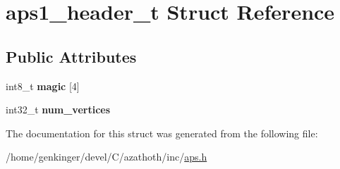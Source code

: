 \hypertarget{structaps1__header__t}{}\section{aps1\+\_\+header\+\_\+t Struct Reference}
\label{structaps1__header__t}
\subsection*{Public Attributes}
\begin{DoxyCompactItemize}
\item 
\mbox{\label{structaps1__header__t_ae9fcd3abb8dab1cfea28ea54cc7f3803}} 
int8\+\_\+t {\bfseries magic} \mbox{[}4\mbox{]}
\item 
\mbox{\label{structaps1__header__t_a77fdc3b3bc2b357c007b20d2224bd77a}} 
int32\+\_\+t {\bfseries num\+\_\+vertices}
\end{DoxyCompactItemize}


The documentation for this struct was generated from the following file\+:\begin{DoxyCompactItemize}
\item 
/home/genkinger/devel/\+C/azathoth/inc/\mbox{\hyperlink{aps_8h}{aps.\+h}}\end{DoxyCompactItemize}
